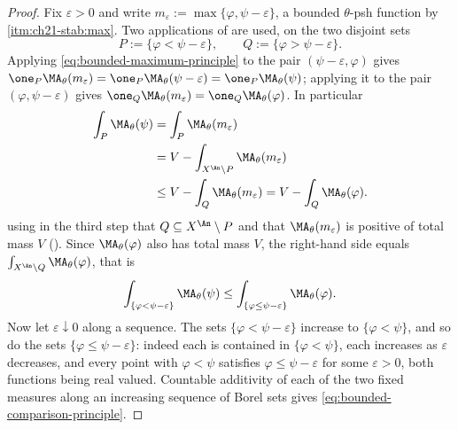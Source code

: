 \begin{proof}
Fix $\varepsilon>0$ and write $m_\varepsilon:=\max\{\varphi,
\psi-\varepsilon\}$, a bounded $\theta$-psh function by
\,\cref{itm:ch21-stab:max}.  Two applications of
 are used, on the two disjoint sets
\[
 P:=\{\varphi<\psi-\varepsilon\},\qquad
 Q:=\{\varphi>\psi-\varepsilon\} .
\]
Applying \eqref{eq:bounded-maximum-principle} to the pair
$(\psi-\varepsilon,\varphi)$ gives
$\one_P\MA_\theta(m_\varepsilon)=\one_P\MA_\theta(\psi-\varepsilon)
=\one_P\MA_\theta(\psi)$; applying it to the pair
$(\varphi,\psi-\varepsilon)$ gives
$\one_Q\MA_\theta(m_\varepsilon)=\one_Q\MA_\theta(\varphi)$.  In
particular
\begin{equation}
\label{eq:ch25-comparison-step}
 \begin{aligned}
 \int_P\MA_\theta(\psi)&=\int_P\MA_\theta(m_\varepsilon)\\
 &=V-\int_{X^{\An}\setminus P}\MA_\theta(m_\varepsilon)\\
 &\leq V-\int_Q\MA_\theta(m_\varepsilon)
 =V-\int_Q\MA_\theta(\varphi).
 \end{aligned}
\end{equation}
using in the third step that $Q\subseteq X^{\An}\setminus P$ and that
$\MA_\theta(m_\varepsilon)$ is positive of total mass $V$
().  Since $\MA_\theta(\varphi)$ also has
total mass $V$, the right-hand side equals
$\int_{X^{\An}\setminus Q}\MA_\theta(\varphi)$, that is
\[
 \int_{\{\varphi<\psi-\varepsilon\}}\MA_\theta(\psi)
 \leq\int_{\{\varphi\leq\psi-\varepsilon\}}\MA_\theta(\varphi).
\]
Now let $\varepsilon\downarrow0$ along a sequence.  The sets
$\{\varphi<\psi-\varepsilon\}$ increase to $\{\varphi<\psi\}$, and so do
the sets $\{\varphi\leq\psi-\varepsilon\}$: indeed each is contained in
$\{\varphi<\psi\}$, each increases as $\varepsilon$ decreases, and every
point with $\varphi<\psi$ satisfies $\varphi\leq\psi-\varepsilon$ for
some $\varepsilon>0$, both functions being real valued.  Countable
additivity of each of the two fixed measures along an increasing sequence of
Borel sets gives \eqref{eq:bounded-comparison-principle}.
\end{proof}

